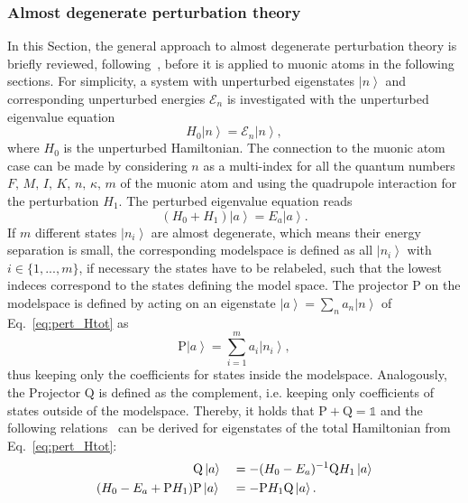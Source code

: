 \subsubsection{Almost degenerate perturbation theory}
\label{sec:almostDeg}
In this Section, the general approach to almost degenerate perturbation theory is briefly reviewed, following~\cite{BorieRinker1982,sakurai1994}, before it is applied to muonic atoms in the following sections. For simplicity, a system with unperturbed eigenstates $\left|n\right>$ and corresponding unperturbed energies $\mathcal{E}_n$ is investigated with the unperturbed eigenvalue equation
\begin{equation}
H_0 \left|n\right> = \mathcal{E}_n \left|n\right>,
\end{equation}
where $H_0$ is the unperturbed Hamiltonian.
The connection to the muonic atom case can be made by considering $n$ as a multi-index for all the quantum numbers $F,\,M,\,I,\,K,\,n,\,\kappa,\,m$ of the muonic atom and using the quadrupole interaction for the perturbation $H_1$. The perturbed eigenvalue equation reads
\begin{equation}
\label{eq:pert_Htot}
\left(H_0 + H_1\right) \left|a\right> = E_a \left|a\right>.
\end{equation}
If $m$ different states $\left| n_i \right>$ are almost degenerate, which means their energy separation is small, the corresponding modelspace is defined as all $\left| n_i \right>$ with $i\in \{1,...,m\}$, if necessary the states have to be relabeled, such that the lowest indeces correspond to the states defining the model space. The projector $\text{P}$ on the modelspace is defined by acting on an eigenstate $\left|a\right> = \sum_n a_n \left|n\right>$ of Eq.~\eqref{eq:pert_Htot} as
\begin{equation}
\text{P}\left|a\right> = \sum_{i=1}^m a_i \left|n_i\right>,
\end{equation}
thus keeping only the coefficients for states inside the modelspace. Analogously, the Projector $\text{Q}$ is defined as the complement, i.e. keeping only coefficients of states outside of the modelspace. Thereby, it holds that $\text{P}+\text{Q}=\mathbb{1}$ and the following relations~\cite{BorieRinker1982} can be derived for eigenstates of the total Hamiltonian from Eq.~\eqref{eq:pert_Htot}:
\begin{alignat}{2}
&\text{Q}\left|a\right> &&= - (H_0-E_a)^{-1}\text{Q}H_1 \left|a\right>\notag\\
 (H_0-E_a+\text{P}H_1)&\text{P}\left|a\right>&&= -\text{P}H_1\text{Q}\left|a\right>.
\end{alignat}
